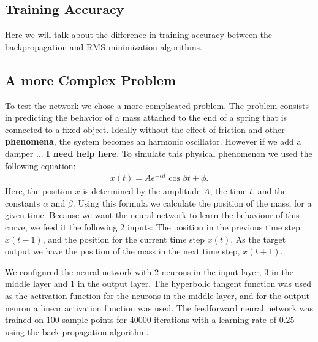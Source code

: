 \documentclass[11pt]{article}
\begin{document}
\subsection{Training Accuracy} %
\label{sub:training_accuracy}

Here we will talk about the difference in training accuracy between the backpropagation and RMS minimization algorithms.


\subsection{A more Complex Problem} %
\label{sub:a_more_complex_problem}

To test the network we chose a more complicated problem. The problem consists in predicting the behavior of a mass attached to the end
of a spring that is connected to a fixed object. Ideally without the effect of friction and other \textbf{phenomena}, the system becomes
an harmonic oscillator. However if we add a damper ... \textbf{I need help here}. To simulate this physical phenomenon we used the
following equation:
\begin{eqnarray}\label{eqn:damping}
	x(t) = Ae^{-\alpha t}\cos{\beta t+\phi}.
\end{eqnarray}
Here, the position $x$ is determined by the amplitude $A$, the time $t$, and the constants $\alpha$ and $\beta$. Using this formula we
calculate the position of the mass, for a given time. Because we want the neural network to learn the behaviour of this curve, we feed
it the following $2$ inputs: The position in the previous time step $x(t-1)$, and the position for the current time step $x(t)$. As the
target output we have the position of the mass in the next time step, $x(t+1)$.

We configured the neural network with $2$ neurons in the input layer, $3$ in the middle layer and $1$ in the output layer. The
hyperbolic tangent function was used as the activation function for the neurons in the middle layer, and for the output neuron a linear
activation function was used. The feedforward neural network was trained on $100$ sample points for $40000$ iterations with a learning
rate of $0.25$ using the back-propagation algorithm.
\end{document}
